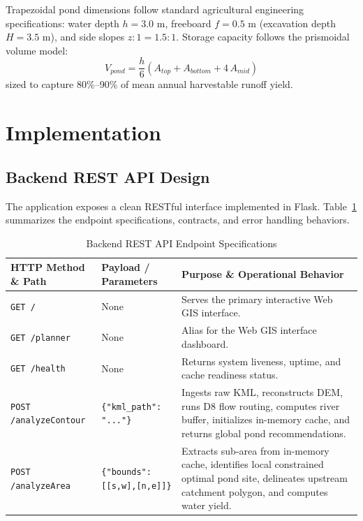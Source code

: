 \documentclass[manuscript,screen,review]{acmart}
\begin{document}
Trapezoidal pond dimensions follow standard agricultural engineering specifications: water depth $h = 3.0\text{ m}$, freeboard $f = 0.5\text{ m}$ (excavation depth $H = 3.5\text{ m}$), and side slopes $z:1 = 1.5:1$. Storage capacity follows the prismoidal volume model:
\begin{equation}
    V_{pond} = \frac{h}{6} \left( A_{top} + A_{bottom} + 4\,A_{mid} \right)
\end{equation}
sized to capture 80\%--90\% of mean annual harvestable runoff yield.

\section{Implementation}
\label{sec:implementation}

\subsection{Backend REST API Design}
The application exposes a clean RESTful interface implemented in Flask. Table~\ref{tab:apis} summarizes the endpoint specifications, contracts, and error handling behaviors.

\begin{table}[htb]
  \caption{Backend REST API Endpoint Specifications}
  \label{tab:apis}
  \footnotesize
  \renewcommand{\arraystretch}{0.90}
  \begin{tabular}{llp{7.2cm}}
    \toprule
    HTTP Method \& Path & Payload / Parameters & Purpose \& Operational Behavior \\
    \midrule
    \texttt{GET /} & None & Serves the primary interactive Web GIS interface. \\
    \texttt{GET /planner} & None & Alias for the Web GIS interface dashboard. \\
    \texttt{GET /health} & None & Returns system liveness, uptime, and cache readiness status. \\
    \texttt{POST /analyzeContour} & \texttt{\{"kml\_path": "..."\}} & Ingests raw KML, reconstructs DEM, runs D8 flow routing, computes river buffer, initializes in-memory cache, and returns global pond recommendations. \\
    \texttt{POST /analyzeArea} & \texttt{\{"bounds": [[s,w],[n,e]]\}} & Extracts sub-area from in-memory cache, identifies local constrained optimal pond site, delineates upstream catchment polygon, and computes water yield. \\
    \bottomrule
  \end{tabular}
\end{table}
\end{document}
